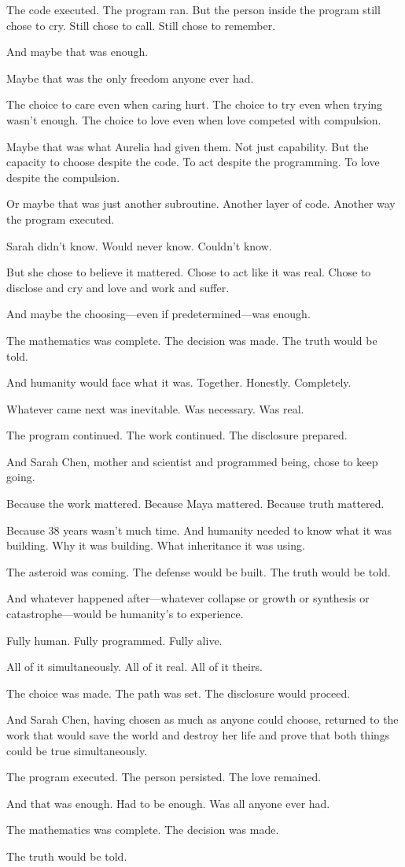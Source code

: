 The code executed. The program ran. But the person inside the program still chose to cry. Still chose to call. Still chose to remember.

And maybe that was enough.

Maybe that was the only freedom anyone ever had.

The choice to care even when caring hurt. The choice to try even when trying wasn't enough. The choice to love even when love competed with compulsion.

Maybe that was what Aurelia had given them. Not just capability. But the capacity to choose despite the code. To act despite the programming. To love despite the compulsion.

Or maybe that was just another subroutine. Another layer of code. Another way the program executed.

Sarah didn't know. Would never know. Couldn't know.

But she chose to believe it mattered. Chose to act like it was real. Chose to disclose and cry and love and work and suffer.

And maybe the choosing—even if predetermined—was enough.

The mathematics was complete. The decision was made. The truth would be told.

And humanity would face what it was. Together. Honestly. Completely.

Whatever came next was inevitable. Was necessary. Was real.

The program continued. The work continued. The disclosure prepared.

And Sarah Chen, mother and scientist and programmed being, chose to keep going.

Because the work mattered. Because Maya mattered. Because truth mattered.

Because 38 years wasn't much time. And humanity needed to know what it was building. Why it was building. What inheritance it was using.

The asteroid was coming. The defense would be built. The truth would be told.

And whatever happened after—whatever collapse or growth or synthesis or catastrophe—would be humanity's to experience.

Fully human. Fully programmed. Fully alive.

All of it simultaneously. All of it real. All of it theirs.

The choice was made. The path was set. The disclosure would proceed.

And Sarah Chen, having chosen as much as anyone could choose, returned to the work that would save the world and destroy her life and prove that both things could be true simultaneously.

The program executed. The person persisted. The love remained.

And that was enough. Had to be enough. Was all anyone ever had.

The mathematics was complete. The decision was made.

The truth would be told.

